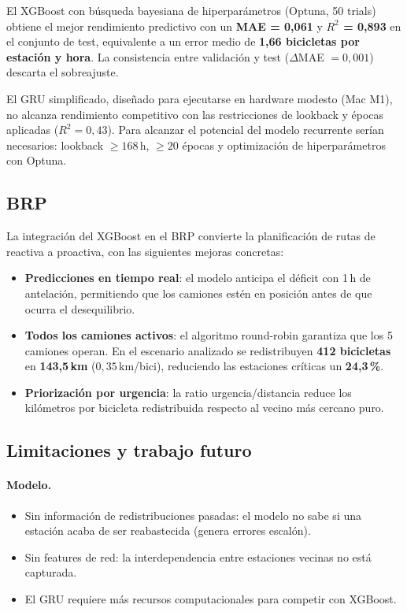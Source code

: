 \documentclass[12pt,a4paper]{article}
\begin{document}
El XGBoost con búsqueda bayesiana de hiperparámetros (Optuna, 50 trials) obtiene
el mejor rendimiento predictivo con un \textbf{MAE = 0,061} y \textbf{$R^2$ = 0,893}
en el conjunto de test, equivalente a un error medio de \textbf{1,66 bicicletas por
estación y hora}. La consistencia entre validación y test ($\Delta$MAE $= 0,001$)
descarta el sobreajuste.

El GRU simplificado, diseñado para ejecutarse en hardware modesto (Mac M1), no
alcanza rendimiento competitivo con las restricciones de lookback y épocas
aplicadas ($R^2 = 0{,}43$). Para alcanzar el potencial del modelo recurrente
serían necesarios: lookback $\geq 168\,\text{h}$, $\geq 20$ épocas y
optimización de hiperparámetros con Optuna.

\subsection{BRP}

La integración del XGBoost en el BRP convierte la planificación de rutas de
reactiva a proactiva, con las siguientes mejoras concretas:

\begin{itemize}
  \item \textbf{Predicciones en tiempo real}: el modelo anticipa el déficit con 1\,h de
        antelación, permitiendo que los camiones estén en posición antes de que
        ocurra el desequilibrio.
  \item \textbf{Todos los camiones activos}: el algoritmo round-robin garantiza que los
        5 camiones operan. En el escenario analizado se redistribuyen \textbf{412 bicicletas}
        en \textbf{143,5\,km} ($0{,}35$\,km/bici), reduciendo las estaciones críticas un
        \textbf{24,3\,\%}.
  \item \textbf{Priorización por urgencia}: la ratio urgencia/distancia reduce los
        kilómetros por bicicleta redistribuida respecto al vecino más cercano puro.
\end{itemize}

\subsection{Limitaciones y trabajo futuro}

\paragraph{Modelo.}
\begin{itemize}
  \item Sin información de redistribuciones pasadas: el modelo no sabe si una estación
        acaba de ser reabastecida (genera errores escalón).
  \item Sin features de red: la interdependencia entre estaciones vecinas no está capturada.
  \item El GRU requiere más recursos computacionales para competir con XGBoost.
\end{itemize}
\end{document}
